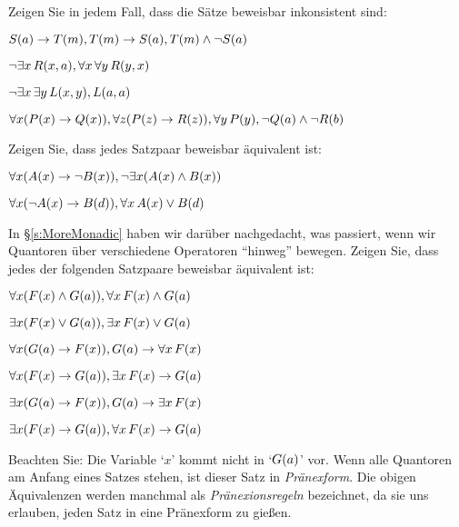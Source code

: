 \practiceproblems
\problempart
Zeigen Sie in jedem Fall, dass die Sätze beweisbar inkonsistent sind:
\begin{earg}
\item $\mathord{S}(a)\rightarrow \mathord{T}(m), \mathord{T}(m) \rightarrow \mathord{S}(a), \mathord{T}(m) \wedge \neg \mathord{S}(a)$
\item $\neg\exists x\,\mathord{R}(x,a), \forall x\, \forall y\,\mathord{R}(y,x)$
\item $\neg\exists x\, \exists y\,\mathord{L}(x,y), \mathord{L}(a,a)$
\item $\forall x(\mathord{P}(x) \rightarrow \mathord{Q}(x)), \forall z(\mathord{P}(z) \rightarrow \mathord{R}(z)), \forall y\,\mathord{P}(y), \neg \mathord{Q}(a) \wedge \neg \mathord{R}(b)$
\end{earg}

\problempart
Zeigen Sie, dass jedes Satzpaar beweisbar äquivalent ist:
\begin{earg}
\item $\forall x (\mathord{A}(x)\rightarrow \neg \mathord{B}(x)), \neg\exists x(\mathord{A}(x) \wedge \mathord{B}(x))$
\item $\forall x (\neg\mathord{A}(x)\rightarrow \mathord{B}(d)), \forall x\,\mathord{A}(x) \vee \mathord{B}(d)$
\end{earg}

\problempart
In \S\ref{s:MoreMonadic} haben wir darüber nachgedacht, was passiert, wenn wir Quantoren über verschiedene Operatoren ``hinweg'' bewegen. Zeigen Sie, dass jedes der folgenden Satzpaare beweisbar äquivalent ist:
\begin{earg}
\item $\forall x(\mathord{F}(x) \wedge \mathord{G}(a)), \forall x\,\mathord{F}(x) \wedge \mathord{G}(a)$
\item $\exists x(\mathord{F}(x) \vee \mathord{G}(a)), \exists x\,\mathord{F}(x) \vee \mathord{G}(a)$
\item $\forall x(\mathord{G}(a) \rightarrow \mathord{F}(x)), \mathord{G}(a) \rightarrow \forall x\,\mathord{F}(x)$
\item $\forall x(\mathord{F}(x) \rightarrow \mathord{G}(a)), \exists x\,\mathord{F}(x) \rightarrow \mathord{G}(a)$
\item $\exists x(\mathord{G}(a) \rightarrow \mathord{F}(x)), \mathord{G}(a) \rightarrow \exists x\,\mathord{F}(x)$
\item $\exists x(\mathord{F}(x) \rightarrow \mathord{G}(a)), \forall x\,\mathord{F}(x) \rightarrow \mathord{G}(a)$
\end{earg}
Beachten Sie: Die Variable `$x$' kommt nicht in `$\mathord{G}(a)$' vor. Wenn alle Quantoren am Anfang eines Satzes stehen, ist dieser Satz in \emph{Pränexform}. Die obigen Äquivalenzen werden manchmal als \emph{Pränexionsregeln} bezeichnet, da sie uns erlauben, jeden Satz in eine Pränexform zu gie{\ss}en.

